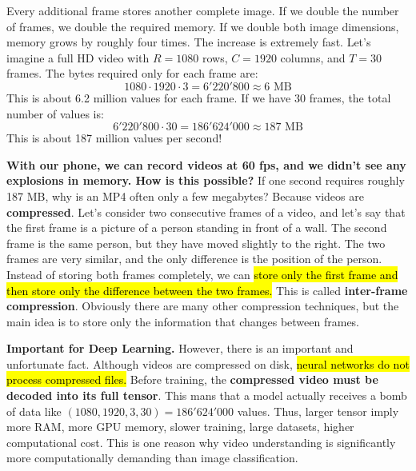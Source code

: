 \highspace
Every additional frame stores another complete image. If we double the number of frames, we double the required memory. If we double both image dimensions, memory grows by roughly four times. The increase is extremely fast. Let's imagine a full HD video with $R = 1080$ rows, $C = 1920$ columns, and $T = 30$ frames. The bytes required only for each frame are:
\begin{equation*}
    1080 \cdot 1920 \cdot 3 = 6'220'800 \approx 6 \text{ MB}
\end{equation*}
This is about 6.2 million values for each frame. If we have 30 frames, the total number of values is:
\begin{equation*}
    6'220'800 \cdot 30 = 186'624'000 \approx 187 \text{ MB}
\end{equation*}
This is about 187 million values per second!

\highspace
\textcolor{Green3}{ \textbf{With our phone, we can record videos at 60 fps, and we didn't see any explosions in memory. How is this possible?}} If one second requires roughly 187 MB, why is an MP4 often only a few megabytes? Because videos are \textbf{compressed}. Let's consider two consecutive frames of a video, and let's say that the first frame is a picture of a person standing in front of a wall. The second frame is the same person, but they have moved slightly to the right. The two frames are very similar, and the only difference is the position of the person. Instead of storing both frames completely, we can \hl{store only the first frame and then store only the difference between the two frames.} This is called \textbf{inter-frame compression}. Obviously there are many other compression techniques, but the main idea is to store only the information that changes between frames.

\highspace
\textcolor{Red2}{ \textbf{Important for Deep Learning.}} However, there is an important and unfortunate fact. Although videos are compressed on disk, \hl{neural networks do not process compressed files.} Before training, the \textbf{compressed video must be decoded into its full tensor}. This mans that a model actually receives a bomb of data like $\left(1080, 1920, 3, 30\right) = 186'624'000$ values. Thus, larger tensor imply more RAM, more GPU memory, slower training, large datasets, higher computational cost. This is one reason why video understanding is significantly more computationally demanding than image classification.